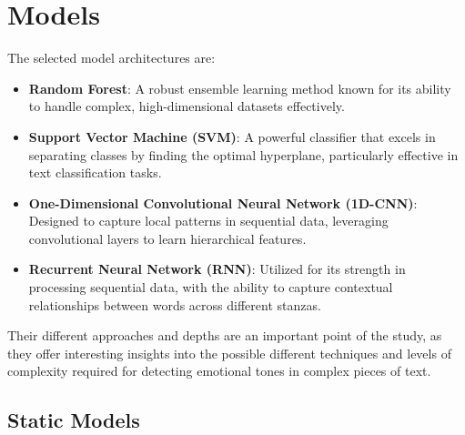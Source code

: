 \section*{Models}
The selected model architectures are:
\begin{itemize} 
    \item \textbf{Random Forest}: A robust ensemble learning method known for
    its ability to handle complex, high-dimensional datasets effectively.
    \item \textbf{Support Vector Machine (SVM)}: A powerful classifier that
    excels in separating classes by finding the optimal hyperplane,
    particularly effective in text classification tasks.
    \item \textbf{One-Dimensional Convolutional Neural Network (1D-CNN)}:
    Designed to capture local patterns in sequential data, leveraging
    convolutional layers to learn hierarchical features.
    \item \textbf{Recurrent Neural Network (RNN)}: Utilized for its strength
    in processing sequential data, with the ability to capture contextual
    relationships between words across different stanzas.
\end{itemize}
Their different approaches and depths are an important point of the study, as they
offer interesting insights into the possible different techniques and levels of
complexity required for detecting emotional tones in complex pieces of text.

\subsection*{Static Models}


